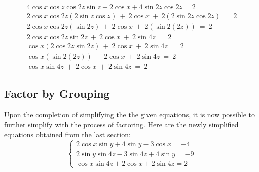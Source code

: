 \documentclass[a4paper,12pt]{article}
\begin{document}
\begin{equation}
    \begin{split}
        4\cos x\cos z\cos2z\sin z+2\cos x+4\sin2z\cos2z=2 \\
        2\cos x\cos2z\left(2\sin z\cos z\right)\ +\ 2\cos x\ +\ 2\left(2\sin2z\cos2z\right)\ =\ 2 \\
        2\cos x\cos2z\left(\sin2z\right)\ +\ 2\cos x\ +\ 2\left(\sin2\left(2z\right)\right)\ =\ 2 \\
        2\cos x\cos2z\sin2z\ +\ 2\cos x\ +\ 2\sin4z\ =\ 2 \\
        \cos x\left(2\cos2z\sin2z\right)\ +\ 2\cos x\ +\ 2\sin4z\ =\ 2 \\
        \cos x\left(\sin2\left(2z\right)\right)\ +\ 2\cos x\ +\ 2\sin4z\ =\ 2 \\
        \cos x\sin4z\ +\ 2\cos x\ +\ 2\sin4z\ =\ 2
    \end{split}
\end{equation}
\subsection*{Factor by Grouping}
Upon the completion of simplifying the the given equations, it is now possible to further simplify with the process of factoring. \newline
Here are the newly simplified equations obtained from the last section:
$$
\begin{cases}
    2\cos x\sin y+ 4\sin y-3\cos x = -4\\
    2\sin y\sin 4z-3\sin 4z+4\sin y=-9 \\
    \cos x\sin 4z + 2\cos x + 2\sin 4z = 2
\end{cases}
$$
\end{document}
